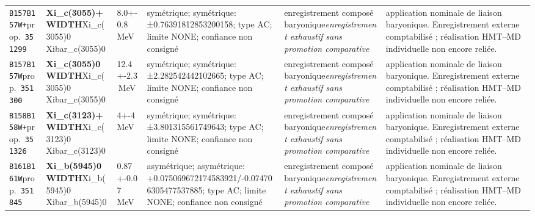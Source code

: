 \begin{landscape}
\begin{longtable}{L{1.85cm}L{4.45cm}L{2.35cm}L{4.05cm}L{3.35cm}L{7.15cm}}
\texttt{B157}\newline \texttt{B157W+}\newline prop.\ \texttt{351299} & \textbf{Xi\_\allowbreak{}c(3055)+ WIDTH}\newline Xi\_\allowbreak{}c(3055)0 \textbar{}\allowbreak{} Xibar\_\allowbreak{}c(3055)0 & 8.0+-0.8\,MeV & symétrique; symétrique: ±0.76391812853200158; type AC; limite NONE; confiance non consigné & enregistrement composé baryonique\newline \emph{enregistrement exhaustif sans promotion comparative} & application nominale de liaison baryonique. Enregistrement externe comptabilisé ; réalisation HMT--MD individuelle non encore reliée. \\
\texttt{B157}\newline \texttt{B157W}\newline prop.\ \texttt{351300} & \textbf{Xi\_\allowbreak{}c(3055)0 WIDTH}\newline Xi\_\allowbreak{}c(3055)0 \textbar{}\allowbreak{} Xibar\_\allowbreak{}c(3055)0 & 12.4+-2.3\,MeV & symétrique; symétrique: ±2.282542442102665; type AC; limite NONE; confiance non consigné & enregistrement composé baryonique\newline \emph{enregistrement exhaustif sans promotion comparative} & application nominale de liaison baryonique. Enregistrement externe comptabilisé ; réalisation HMT--MD individuelle non encore reliée. \\
\texttt{B158}\newline \texttt{B158W+}\newline prop.\ \texttt{351326} & \textbf{Xi\_\allowbreak{}c(3123)+ WIDTH}\newline Xi\_\allowbreak{}c(3123)0 \textbar{}\allowbreak{} Xibar\_\allowbreak{}c(3123)0 & 4+-4\,MeV & symétrique; symétrique: ±3.801315561749643; type AC; limite NONE; confiance non consigné & enregistrement composé baryonique\newline \emph{enregistrement exhaustif sans promotion comparative} & application nominale de liaison baryonique. Enregistrement externe comptabilisé ; réalisation HMT--MD individuelle non encore reliée. \\
\texttt{B161}\newline \texttt{B161W}\newline prop.\ \texttt{351845} & \textbf{Xi\_\allowbreak{}b(5945)0 WIDTH}\newline Xi\_\allowbreak{}b(5945)0 \textbar{}\allowbreak{} Xibar\_\allowbreak{}b(5945)0 & 0.87+-0.07\,MeV & asymétrique; asymétrique: +0.075069672174583921/-0.074706305477537885; type AC; limite NONE; confiance non consigné & enregistrement composé baryonique\newline \emph{enregistrement exhaustif sans promotion comparative} & application nominale de liaison baryonique. Enregistrement externe comptabilisé ; réalisation HMT--MD individuelle non encore reliée. \\

\end{longtable}
\end{landscape}
